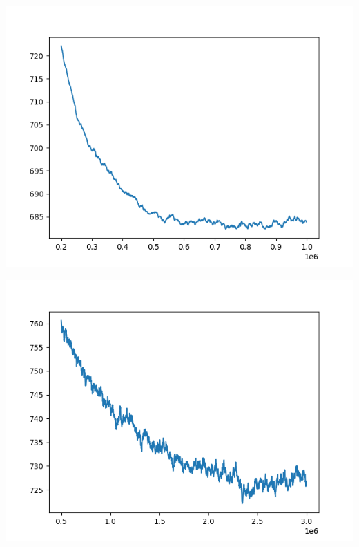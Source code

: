 \documentclass{article}
\begin{document}
\begin{enumerate}[label=\arabic*.]
\begin{minipage}{0.49\linewidth}
            \includegraphics[width=\linewidth]{../starter_code/figs/sgd_wo_k_50.png}
        \end{minipage}\hfill
        \begin{minipage}{0.49\linewidth}
            \includegraphics[width=\linewidth]{../starter_code/figs/sgd_k50.png}
        \end{minipage}\hfill
        \begin{minipage}{0.49\linewidth}

\end{minipage}
\end{enumerate}
\end{document}

